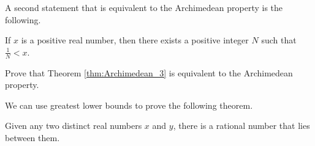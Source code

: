 \item A second statement that is equivalent to the Archimedean property is the following.

\begin{theorem} \label{thm:Archimedean_3} If $x$ is a positive real number, then there exists a positive integer $N$ such that $\frac{1}{N} < x$. 
\end{theorem}

Prove that Theorem \ref{thm:Archimedean_3} is equivalent to the Archimedean property. 
\ea

\begin{comment}

\ExerciseSolution

\ba

\item 
	\begin{enumerate}[i.]
	\item Let $z = \frac{y}{x}$. The Archimedean property shows that there is a positive integer $N$ such that $N > z - \frac{y}{x}$. Since $x > 0$ it follows that $Nx > y$. 

	\item The Archimedean property follows from Theorem \ref{thm:Archimedean_2} by letting $x = 1$. 

	\end{enumerate}
	
\item  First we show that the Archimedean property implies Theorem \ref{thm:Archimedean_3}. Let $x$ be a positive number, and let $y = \frac{1}{x}$. By the Archimedean property, there exists a positive integer $N$ such that $N > y = \frac{1}{x}$. But then $\frac{1}{N} < x$. 

Now we show that Theorem \ref{thm:Archimedean_3} implies the Archimedean property. Let $x$ be a real number. If $x < 0$, then we can choose $N = 1$. If $x > 0$, then $\frac{1}{x}$ is a positive real number. Theorem \ref{thm:Archimedean_3} shows that there is a positive integer $N$ such that $\frac{1}{N} < \frac{1}{x}$. It follows that $N > x$, verifying the Archimedean property.    

\ea

\end{comment}

\item \label{ex:GLB_rational} We can use greatest lower bounds to prove the following theorem.

\begin{theorem} Given any two distinct real numbers $x$ and $y$, there is a rational number that lies between them.
\end{theorem}


